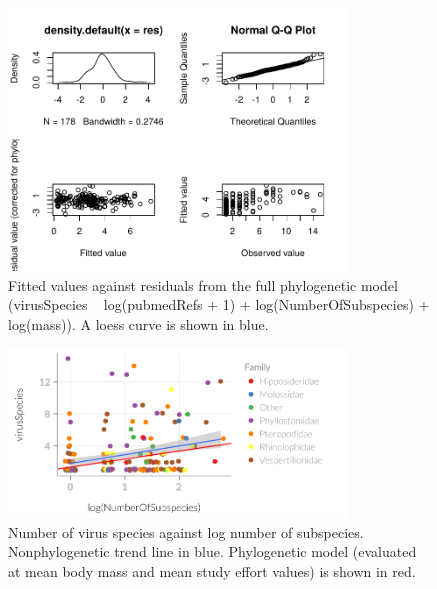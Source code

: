 \begin{knitrout}
\begin{figure}[t]

{\centering \includegraphics[width=0.8\textwidth]{figure/subsAnalysis-5} 

}

\caption[Fitted values against residuals from the full phylogenetic model (virusSpecies ~ log(pubmedRefs + 1) + log(NumberOfSubspecies) +  log(mass))]{Fitted values against residuals from the full phylogenetic model (virusSpecies ~ log(pubmedRefs + 1) + log(NumberOfSubspecies) +  log(mass)). A loess curve is shown in blue.}\label{fig:subsAnalysis}
\end{figure}


\end{knitrout}


\begin{knitrout}\footnotesize
{}\color{fgcolor}\begin{figure}[t]

{\centering \includegraphics[width=0.8\textwidth]{figure/plotSubspecies-1} 

}

\caption[Number of virus species against log number of subspecies]{Number of virus species against log number of subspecies. Nonphylogenetic trend line in blue. Phylogenetic model (evaluated at mean body mass and mean study effort values) is shown in red.}\label{fig:plotSubspecies}
\end{figure}


\end{knitrout}

